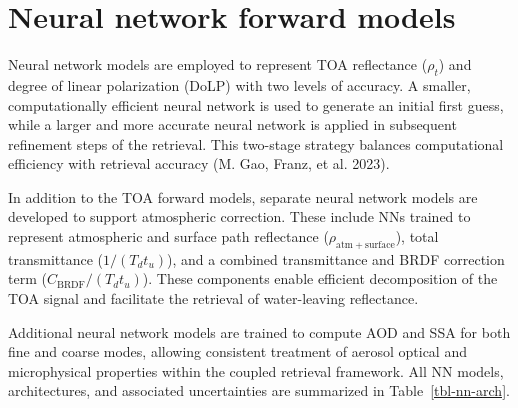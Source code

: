 \documentclass[
  letterpaper,
  open=any]{scrbook}
\begin{document}
\section{Neural network forward
models}\label{neural-network-forward-models}

Neural network models are employed to represent TOA reflectance
(\(\rho_t\)) and degree of linear polarization (DoLP) with two levels of
accuracy. A smaller, computationally efficient neural network is used to
generate an initial first guess, while a larger and more accurate neural
network is applied in subsequent refinement steps of the retrieval. This
two-stage strategy balances computational efficiency with retrieval
accuracy (M. Gao, Franz, et al. 2023).

In addition to the TOA forward models, separate neural network models
are developed to support atmospheric correction. These include NNs
trained to represent atmospheric and surface path reflectance
(\(\rho_{\mathrm{atm+surface}}\)), total transmittance
(\(1/(T_d t_u)\)), and a combined transmittance and BRDF correction term
(\(C_{\mathrm{BRDF}}/(T_d t_u)\)). These components enable efficient
decomposition of the TOA signal and facilitate the retrieval of
water-leaving reflectance.

Additional neural network models are trained to compute AOD and SSA for
both fine and coarse modes, allowing consistent treatment of aerosol
optical and microphysical properties within the coupled retrieval
framework. All NN models, architectures, and associated uncertainties
are summarized in Table~\ref{tbl-nn-arch}.
\end{document}
